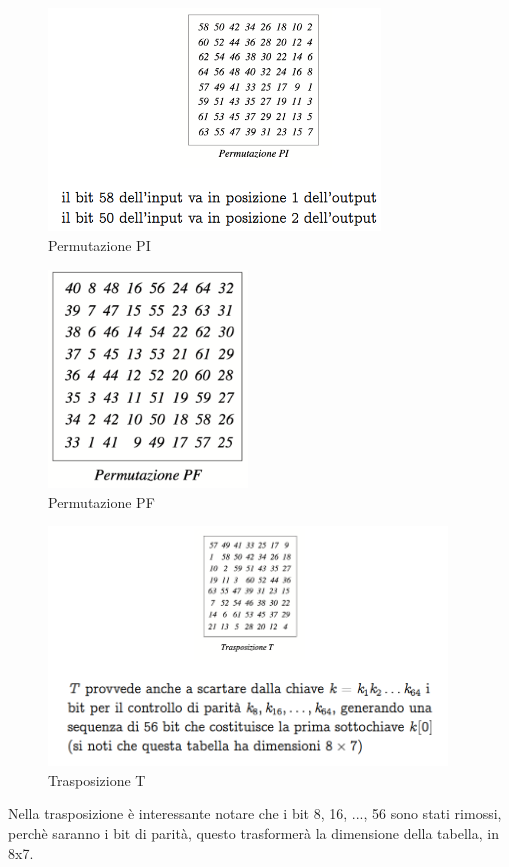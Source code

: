 \begin{figure}[htp]
	\includegraphics[width=250pt]{./img/DES_permutazionePI.png}
	\caption{Permutazione PI}
	\label{img:DES_permutazionePI}
\end{figure}

\begin{figure}[htp]
	\includegraphics[width=150pt]{./img/DES_permutazionePF.png}
	\caption{Permutazione PF}
	\label{img:DES_permutazionePF}
\end{figure}

\begin{figure}[htp]
	\includegraphics[width=300pt]{./img/DES_trasposizione.png}
	\caption{Trasposizione T}
	\label{img:DES_trasposizione}
\end{figure}


Nella trasposizione è interessante notare che i bit 8, 16, ..., 56 sono stati rimossi, perchè saranno i bit di parità, questo trasformerà la dimensione della tabella, in 8x7.

